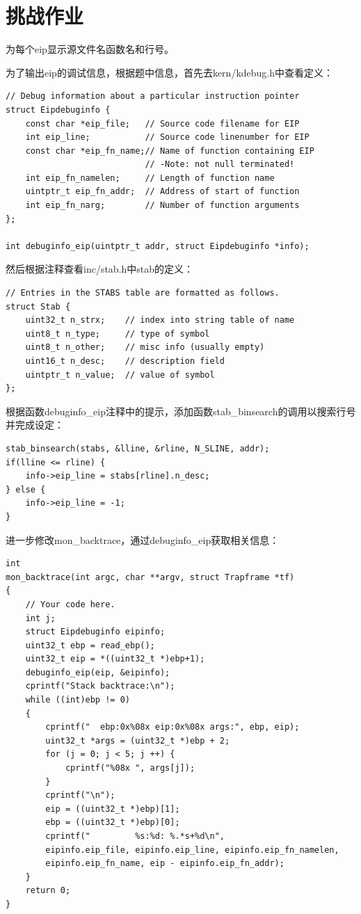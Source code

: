 \documentclass[12pt,a4paper,UTF8]{article}
\begin{document}
\section{挑战作业}

\setcounter{table}{0}
\setcounter{figure}{0}

为每个eip显示源文件名函数名和行号。

为了输出eip的调试信息，根据题中信息，首先去kern/kdebug.h中查看定义：

\begin{lstlisting}[style=CPP]
// Debug information about a particular instruction pointer
struct Eipdebuginfo {
	const char *eip_file;	// Source code filename for EIP
	int eip_line;			// Source code linenumber for EIP
	const char *eip_fn_name;// Name of function containing EIP
							// -Note: not null terminated!
	int eip_fn_namelen;		// Length of function name
	uintptr_t eip_fn_addr;	// Address of start of function
	int eip_fn_narg;		// Number of function arguments
};

int debuginfo_eip(uintptr_t addr, struct Eipdebuginfo *info);	
\end{lstlisting}

然后根据注释查看inc/stab.h中stab的定义：
\begin{lstlisting}[style=CPP]
// Entries in the STABS table are formatted as follows.
struct Stab {
	uint32_t n_strx;	// index into string table of name
	uint8_t n_type;     // type of symbol
	uint8_t n_other;    // misc info (usually empty)
	uint16_t n_desc;    // description field
	uintptr_t n_value;	// value of symbol
};
\end{lstlisting}

根据函数debuginfo\_eip注释中的提示，添加函数stab\_binsearch的调用以搜索行号并完成设定：

\begin{lstlisting}[style=CPP]
stab_binsearch(stabs, &lline, &rline, N_SLINE, addr);
if(lline <= rline) {
	info->eip_line = stabs[rline].n_desc;
} else {
	info->eip_line = -1;
}
\end{lstlisting}

进一步修改mon\_backtrace，通过debuginfo\_eip获取相关信息：

\begin{lstlisting}[style=CPP]
int
mon_backtrace(int argc, char **argv, struct Trapframe *tf)
{
    // Your code here.
	int j;
	struct Eipdebuginfo eipinfo;
    uint32_t ebp = read_ebp();
	uint32_t eip = *((uint32_t *)ebp+1);
	debuginfo_eip(eip, &eipinfo);
    cprintf("Stack backtrace:\n");
    while ((int)ebp != 0)
    {
		cprintf("  ebp:0x%08x eip:0x%08x args:", ebp, eip);
        uint32_t *args = (uint32_t *)ebp + 2;
        for (j = 0; j < 5; j ++) {
            cprintf("%08x ", args[j]);
        }
        cprintf("\n");
        eip = ((uint32_t *)ebp)[1];
		ebp = ((uint32_t *)ebp)[0];
		cprintf("         %s:%d: %.*s+%d\n", 
		eipinfo.eip_file, eipinfo.eip_line, eipinfo.eip_fn_namelen, 
		eipinfo.eip_fn_name, eip - eipinfo.eip_fn_addr);
    }
    return 0;
}
\end{lstlisting}
\end{document}
